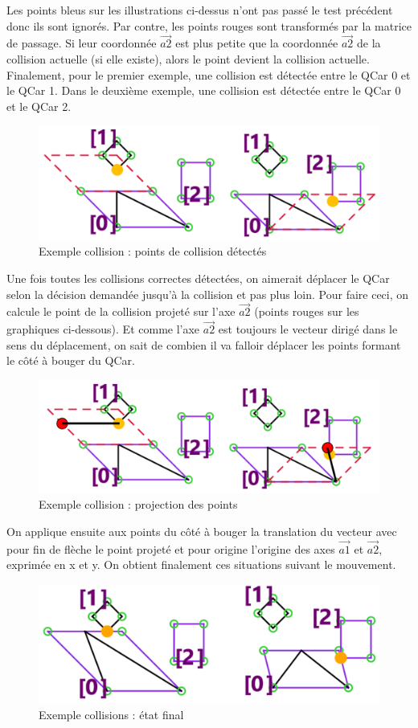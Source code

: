 \documentclass[a4paper, 12pt]{article}
\begin{document}
Les points bleus sur les illustrations ci-dessus n'ont pas passé le test précédent donc ils sont ignorés. Par contre, les points rouges sont transformés par la matrice de passage. Si leur coordonnée $\vec{a2}$ est plus petite que la coordonnée $\vec{a2}$ de la collision actuelle (si elle existe), alors le point devient la collision actuelle.
Finalement, pour le premier exemple, une collision est détectée entre le QCar 0 et le QCar 1. Dans le deuxième exemple, une collision est détectée entre le QCar 0 et le QCar 2.
\begin{figure}[h!]
\centering
\includegraphics[width=0.7\linewidth]{includes/images/collisions/8_collisionPoints}
\caption{Exemple collision : points de collision détectés}
\label{fig:8collisionpoints}
\end{figure}
Une fois toutes les collisions correctes détectées, on aimerait déplacer le QCar selon la décision demandée jusqu'à la collision et pas plus loin. Pour faire ceci, on calcule le point de la collision projeté sur l'axe $\vec{a2}$ (points rouges sur les graphiques ci-dessous). Et comme l'axe $\vec{a2}$ est toujours le vecteur dirigé dans le sens du déplacement, on sait de combien il va falloir déplacer les points formant le côté à bouger du QCar.
\begin{figure}[h!]
\centering
\includegraphics[width=0.7\linewidth]{includes/images/collisions/9_projectionPoints}
\caption{Exemple collision : projection des points}
\label{fig:9projectionpoints}
\end{figure}
On applique ensuite aux points du côté à bouger la translation du vecteur avec pour fin de flèche le point projeté et pour origine l'origine des axes $\vec{a1}$ et $\vec{a2}$, exprimée en x et y.
On obtient finalement ces situations suivant le mouvement.
\begin{figure}[h!]
\centering
\includegraphics[width=0.7\linewidth]{includes/images/collisions/10_finalState}
\caption{Exemple collisions : état final}
\label{fig:10finalstate}
\end{figure}
\end{document}
